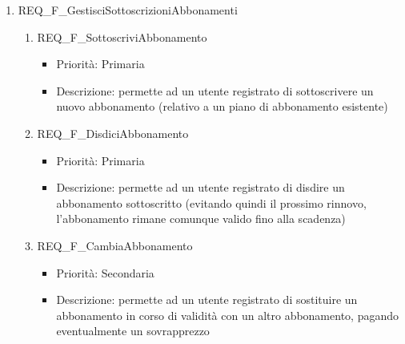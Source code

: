 \begin{enumerate}
	\item REQ\_F\_GestisciSottoscrizioniAbbonamenti
		\begin{enumerate}[label*=\arabic*.]			
		\item REQ\_F\_SottoscriviAbbonamento
			\begin{itemize}
			\item Priorità: Primaria	
			\item Descrizione: permette ad un utente registrato di sottoscrivere un nuovo abbonamento (relativo a un piano di abbonamento esistente)
			\end{itemize}

		\item REQ\_F\_DisdiciAbbonamento
			\begin{itemize}	
			\item Priorità: Primaria
			\item Descrizione: permette ad un utente registrato di disdire un abbonamento sottoscritto (evitando quindi il prossimo rinnovo, l'abbonamento rimane comunque valido fino alla scadenza)
			\end{itemize}
				
		\item REQ\_F\_CambiaAbbonamento
			\begin{itemize}	
			\item Priorità: Secondaria
			\item Descrizione: permette ad un utente registrato di sostituire un abbonamento in corso di validità con un altro abbonamento, pagando eventualmente un sovrapprezzo
			\end{itemize}
		\end{enumerate}
	
	

\end{enumerate}
